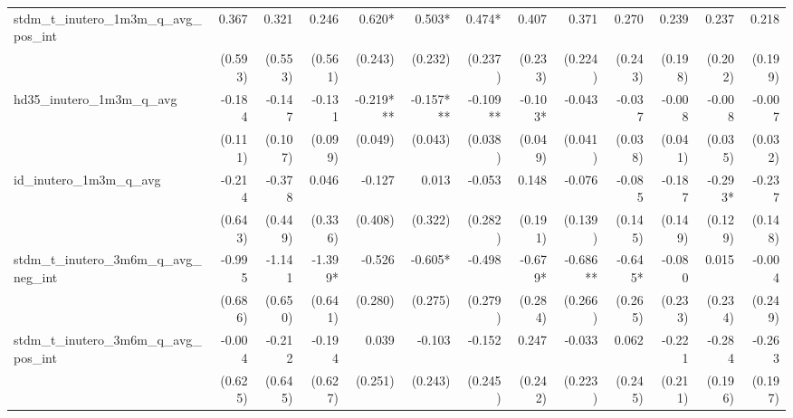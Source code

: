 \begin{tabular}{lrrrrrrrrrrrr}
stdm\_t\_inutero\_1m3m\_q\_avg\_pos\_int    &        0.367 &        0.321 &        0.246 &       0.620* &       0.503* &       0.474* &        0.407 &        0.371 &        0.270 &        0.239 &        0.237 &        0.218 \\ 
                                            &      (0.593) &      (0.553) &      (0.561) &      (0.243) &      (0.232) &      (0.237) &      (0.233) &      (0.224) &      (0.243) &      (0.198) &      (0.202) &      (0.199) \\ 
hd35\_inutero\_1m3m\_q\_avg                 &       -0.184 &       -0.147 &       -0.131 &    -0.219*** &    -0.157*** &     -0.109** &      -0.103* &       -0.043 &       -0.037 &       -0.008 &       -0.008 &       -0.007 \\ 
                                            &      (0.111) &      (0.107) &      (0.099) &      (0.049) &      (0.043) &      (0.038) &      (0.049) &      (0.041) &      (0.038) &      (0.041) &      (0.035) &      (0.032) \\ 
id\_inutero\_1m3m\_q\_avg                   &       -0.214 &       -0.378 &        0.046 &       -0.127 &        0.013 &       -0.053 &        0.148 &       -0.076 &       -0.085 &       -0.187 &      -0.293* &       -0.237 \\ 
                                            &      (0.643) &      (0.449) &      (0.336) &      (0.408) &      (0.322) &      (0.282) &      (0.191) &      (0.139) &      (0.145) &      (0.149) &      (0.129) &      (0.148) \\ 
stdm\_t\_inutero\_3m6m\_q\_avg\_neg\_int    &       -0.995 &       -1.141 &      -1.399* &       -0.526 &      -0.605* &       -0.498 &      -0.679* &     -0.686** &      -0.645* &       -0.080 &        0.015 &       -0.004 \\ 
                                            &      (0.686) &      (0.650) &      (0.641) &      (0.280) &      (0.275) &      (0.279) &      (0.284) &      (0.266) &      (0.265) &      (0.233) &      (0.234) &      (0.249) \\ 
stdm\_t\_inutero\_3m6m\_q\_avg\_pos\_int    &       -0.004 &       -0.212 &       -0.194 &        0.039 &       -0.103 &       -0.152 &        0.247 &       -0.033 &        0.062 &       -0.221 &       -0.284 &       -0.263 \\ 
                                            &      (0.625) &      (0.645) &      (0.627) &      (0.251) &      (0.243) &      (0.245) &      (0.242) &      (0.223) &      (0.245) &      (0.211) &      (0.196) &      (0.197) \\ 

\end{tabular}
